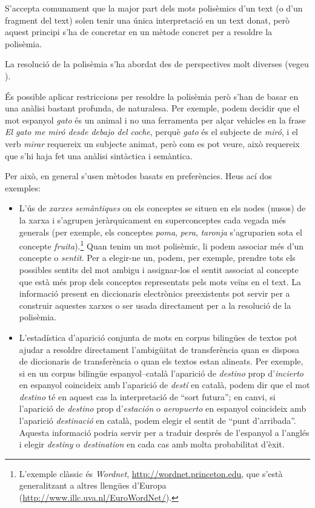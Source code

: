  S'accepta comunament que la major part dels mots polisèmics d'un text
 (o d'un fragment del text) solen tenir una única interpretació en un
 text donat, però aquest principi s'ha de concretar en un mètode
 concret per a resoldre la polisèmia.

 La resolució de la polisèmia s'ha abordat des de perspectives molt
 diverses (vegeu \citet{ide98j}).

 És possible aplicar restriccions per resoldre la polisèmia però s'han
 de basar en una anàlisi bastant profunda, de naturalesa. Per exemple,
 podem decidir que el mot espanyol \emph{gato} és un animal i no una
 ferramenta per alçar vehicles en la frase \emph{El gato me miró desde
   debajo del coche}, perquè \emph{gato} és el subjecte de
 \emph{miró}, i el verb \emph{mirar} requereix un subjecte animat,
 però com es pot veure, això requereix que s'hi haja fet una anàlisi
 sintàctica i semàntica.
 
 Per això, en general s'usen mètodes basats en preferències. Heus ací
 dos exemples:
\begin{itemize}
\item L'ús de \emph{xarxes semàntiques} on els conceptes se situen en
  els nodes (nusos) de la xarxa i s'agrupen jeràrquicament en
  superconceptes cada vegada més generals (per exemple, els conceptes
  \emph{poma}, \emph{pera}, \emph{taronja} s'agruparien sota el
  concepte \emph{fruita}).\footnote{L'exemple clàssic és
    \emph{Wordnet}, \url{http://wordnet.princeton.edu}, que s'està
    generalitzant a altres llengües d'Europa
    (\url{http://www.illc.uva.nl/EuroWordNet/}).}  Quan tenim un mot
  polisèmic, li podem associar més d'un concepte o \emph{sentit}. Per
  a elegir-ne un, podem, per exemple, prendre tots els possibles
  sentits del mot ambigu i assignar-los el sentit associat al concepte
  que està més prop dels conceptes representats pels mots veïns en el
  text.  La informació present en diccionaris electrònics preexistents
  pot servir per a construir aquestes xarxes o ser usada directament
  per a la resolució de la polisèmia.
\item L'estadística d'aparició conjunta de mots en corpus bilingües de
  textos pot ajudar a resoldre directament l'ambigüitat de
  transferència quan es disposa de diccionaris de transferència o quan
  els textos estan alineats. Per exemple, si en un corpus bilingüe
  espanyol--català l'aparició de \emph{destino} prop d'{\em incierto}
  en espanyol coincideix amb l'aparició de \emph{destí} en català,
  podem dir que el mot \emph{destino} té en aquest cas la
  interpretació de ``sort futura''; en canvi, si l'aparició de {\em
    destino} prop d'\emph{estación} o \emph{aeropuerto} en espanyol
  coincideix amb l'aparició \emph{destinació} en català, podem elegir
  el sentit de ``punt d'arribada''. Aquesta informació podria servir
  per a traduir després de l'espanyol a l'anglés i elegir {\em
    destiny} o \emph{destination} en cada cas amb molta probabilitat
  d'èxit.
\end{itemize}


